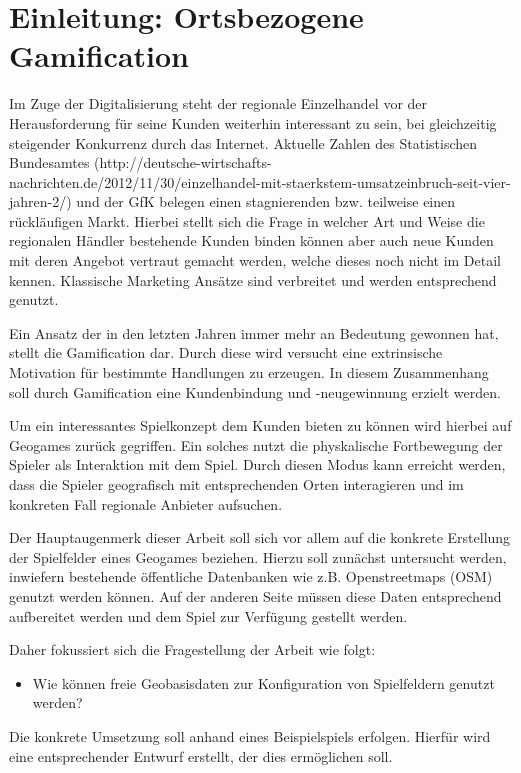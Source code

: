 \chapter{Einleitung: Ortsbezogene Gamification}
\label{ch1:S1_Einleitung}

Im Zuge der Digitalisierung steht der regionale Einzelhandel vor der Herausforderung für seine Kunden weiterhin interessant zu sein, bei gleichzeitig steigender Konkurrenz durch das Internet. Aktuelle Zahlen des Statistischen Bundesamtes (http://deutsche-wirtschafts-nachrichten.de/2012/11/30/einzelhandel-mit-staerkstem-umsatzeinbruch-seit-vier-jahren-2/) und der GfK belegen einen stagnierenden bzw. teilweise einen rückläufigen Markt.
Hierbei stellt sich die Frage in welcher Art und Weise die regionalen Händler bestehende Kunden binden können aber auch neue Kunden mit deren Angebot vertraut gemacht werden, welche dieses noch nicht im Detail kennen.
Klassische Marketing Ansätze sind verbreitet und werden entsprechend genutzt.

Ein Ansatz der in den letzten Jahren immer mehr an Bedeutung gewonnen hat, stellt die Gamification dar. Durch diese wird versucht eine extrinsische Motivation für bestimmte Handlungen zu erzeugen. In diesem Zusammenhang soll durch Gamification eine Kundenbindung und -neugewinnung erzielt werden.

Um ein interessantes Spielkonzept dem Kunden bieten zu können wird hierbei auf Geogames zurück gegriffen.
Ein solches nutzt die physkalische Fortbewegung der Spieler als Interaktion mit dem Spiel.
Durch diesen Modus kann erreicht werden, dass die Spieler geografisch mit entsprechenden Orten interagieren und im konkreten Fall regionale Anbieter aufsuchen.

Der Hauptaugenmerk dieser Arbeit soll sich vor allem auf die konkrete Erstellung der Spielfelder eines Geogames beziehen. Hierzu soll zunächst untersucht werden, inwiefern bestehende öffentliche Datenbanken wie z.B. Openstreetmaps (OSM) genutzt werden können. Auf der anderen Seite müssen diese Daten entsprechend aufbereitet werden und dem Spiel zur Verfügung gestellt werden.

Daher fokussiert sich die Fragestellung der Arbeit wie folgt:
\begin{itemize}
  \item Wie können freie Geobasisdaten zur Konfiguration von Spielfeldern genutzt werden?
\end{itemize}

Die konkrete Umsetzung soll anhand eines Beispielspiels erfolgen. Hierfür wird eine entsprechender Entwurf  erstellt, der dies ermöglichen soll.

